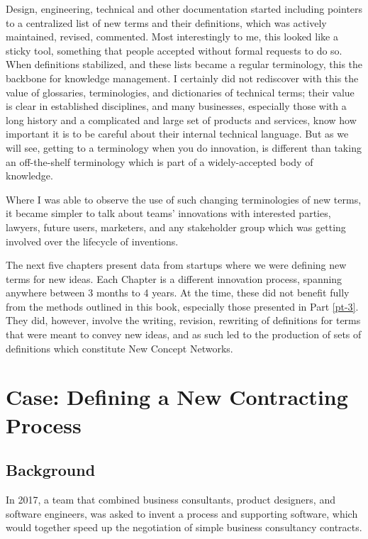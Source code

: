 \documentclass[graybox,envcountchap,sectrefs]{svmono}
\newcommand{\ncnf}{New Concept Network}
\begin{document}
Design, engineering, technical and other documentation started including pointers to a centralized list of new terms and their definitions, which was actively maintained, revised, commented. Most interestingly to me, this looked like a sticky tool, something that people accepted without formal requests to do so. When definitions stabilized, and these lists became a regular terminology, this the backbone for knowledge management. I certainly did not rediscover with this the value of glossaries, terminologies, and dictionaries of technical terms; their value is clear in established disciplines, and many businesses, especially those with a long history and a complicated and large set of products and services, know how important it is to be careful about their internal technical language. But as we will see, getting to a terminology when you do innovation, is different than taking an off-the-shelf terminology which is part of a widely-accepted body of knowledge.

Where I was able to observe the use of such changing terminologies of new terms, it became simpler to talk about teams' innovations with interested parties, lawyers, future users, marketers, and any stakeholder group which was getting involved over the lifecycle of  inventions.

The next five chapters present data from startups where we were defining new terms for new ideas. Each Chapter is a different innovation process, spanning anywhere between 3 months to 4 years. At the time, these did not benefit fully from the methods outlined in this book, especially those presented in Part \ref{pt-3}. They did, however, involve the writing, revision, rewriting of definitions for terms that were meant to convey new ideas, and as such led to the production of sets of definitions which constitute \ncnf s.


\chapter{Case: Defining a New Contracting Process}\label{c:case:contracting-process}

\section{Background}
In 2017, a team that combined business consultants, product designers, and software engineers, was asked to invent a process and supporting software, which would together speed up the negotiation of simple business consultancy contracts. 
\end{document}
